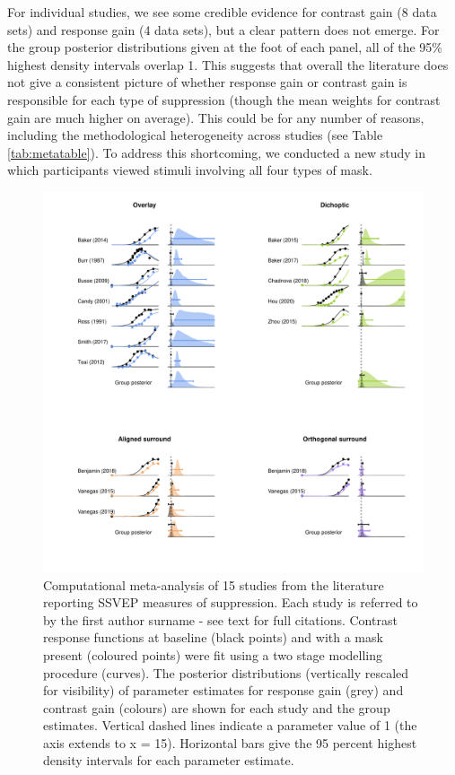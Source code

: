 \documentclass[]{article}
\begin{document}
For individual studies, we see some credible evidence for contrast gain (8 data sets) and response gain (4 data sets), but a clear pattern does not emerge. For the group posterior distributions given at the foot of each panel, all of the 95\% highest density intervals overlap 1. This suggests that overall the literature does not give a consistent picture of whether response gain or contrast gain is responsible for each type of suppression (though the mean weights for contrast gain are much higher on average). This could be for any number of reasons, including the methodological heterogeneity across studies (see Table \ref{tab:metatable}). To address this shortcoming, we conducted a new study in which participants viewed stimuli involving all four types of mask.

\begin{figure}

{\centering \includegraphics{figures/metaanalysis} 

}

\caption{Computational meta-analysis of 15 studies from the literature reporting SSVEP measures of suppression. Each study is referred to by the first author surname - see text for full citations. Contrast response functions at baseline (black points) and with a mask present (coloured points) were fit using a two stage modelling procedure (curves). The posterior distributions (vertically rescaled for visibility) of parameter estimates for response gain (grey) and contrast gain (colours) are shown for each study and the group estimates. Vertical dashed lines indicate a parameter value of 1 (the axis extends to x = 15). Horizontal bars give the 95 percent highest density intervals for each parameter estimate.}\label{fig:metaanalysis}
\end{figure}
\end{document}
